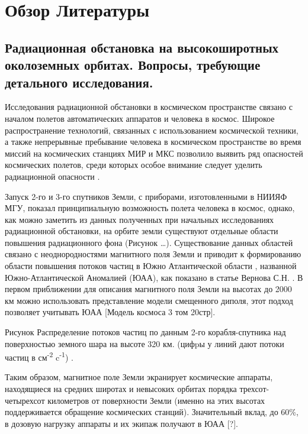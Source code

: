 \chapter{Обзор Литературы} \label{chapt1}

\section{Радиационная обстановка на высокоширотных околоземных орбитах. Вопросы, требующие детального исследования.} \label{sect1_1}

Исследования радиационной обстановки в космическом пространстве связано с началом полетов автоматических аппаратов и человека в космос.  Широкое распространение технологий, связанных с использованием космической техники, а также непрерывные пребывание человека в космическом пространстве во время миссий на космических станциях МИР и МКС позволило выявить ряд опасностей космических полетов, среди которых особое внимание следует уделить радиационной опасности \cite{logachev2007}.


Запуск 2-го и 3-го спутников Земли, с приборами, изготовленными в НИИЯФ МГУ,  показал принципиальную возможность полета человека в космос,  однако, как можно заметить из данных полученных при начальных исследованиях радиационной обстановки, на орбите земли существуют отдельные области повышения радиационного фона (Рисунок \ldots{}). Существование данных областей связано с неоднородностями магнитного поля Земли и приводит к формированию области повышения потоков частиц в Южно Атлантической области \cite{logachev2007}, названной Южно-Атлантической Аномалией (ЮАА), как показано в статье Вернова С.Н.\cite{vernov1961} . В первом приближении для описания магнитного поля  Земли на высотах до 2000 км можно использовать представление модели смещенного диполя, этот подход позволяет учитывать ЮАА [Модель космоса 3 том 20стр].

Рисунок Распределение потоков частиц по данным 2-го корабля-спутника над поверхностью земного шара на высоте 320 км. (цифpы у линий дают потоки частиц в см\textsuperscript{-2} c\textsuperscript{-1}) \cite{logachev2007}.


Таким образом, магнитное поле Земли экранирует космические аппараты, находящиеся на средних широтах и невысоких орбитах порядка трехсот-четырехсот километров от поверхности Земли (именно на этих высотах поддерживается обращение космических станций). Значительный вклад, до 60\%,  в дозовую нагрузку аппараты и их экипаж получают в ЮАА [?].


